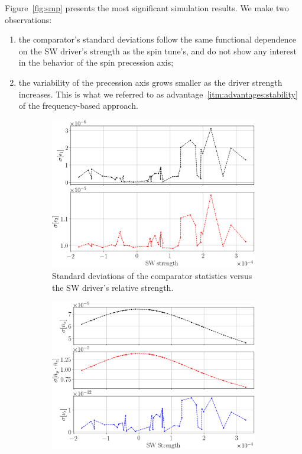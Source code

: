 \documentclass[]{elsarticle}
\begin{document}
Figure~\ref{fig:smp} presents the most significant simulation results. We make two observations:
\begin{enumerate}[(1)]
\item the comparator's standard deviations follow the same functional dependence on the SW driver's
  strength as the spin tune's, and do not show any interest in the behavior of the spin precession axis;
\item the variability of the precession axis grows smaller as the driver strength increases. This is
  what we referred to as advantage~\ref{itm:advantages:stability} of the frequency-based approach.
\end{enumerate}

\begin{figure}[h]\centering
  \begin{subfigure}{\linewidth}
    \includegraphics[width=\linewidth]{img/smp_sim/residual_SD_vs_SW(both)}
    \caption{Standard deviations of the comparator statistics versus the SW driver's
    relative strength.\label{fig:smp:resid}}
  \end{subfigure} 
  \begin{subfigure}{\linewidth}
    \includegraphics[width=\linewidth]{img/smp_sim/NBAR_variation_sd_vs_SW}

\end{subfigure}
\end{figure}
\end{document}
